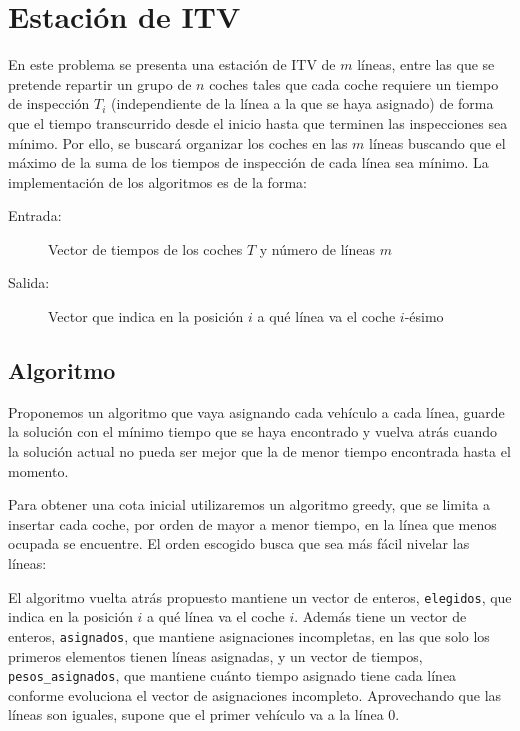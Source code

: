 \section{Estación de ITV}

En este problema se presenta una estación de ITV de $m$ líneas, entre las que
se pretende repartir un grupo de $n$ coches tales que cada coche requiere un
tiempo de inspección $T_i$ (independiente de la línea a la que se haya asignado)
de forma que el tiempo transcurrido desde el inicio hasta que terminen las
inspecciones sea mínimo. Por ello, se buscará organizar los coches en las $m$
líneas buscando que el máximo de la suma de los tiempos de inspección de cada
línea sea mínimo. La implementación de los algoritmos es de la forma:
\begin{description}
	\item[Entrada:] Vector de tiempos de los coches $T$ y número de líneas $m$
	\item[Salida:] Vector que indica en la posición $i$ a qué línea va el coche $i$-ésimo
\end{description}

\subsection{Algoritmo}

Proponemos un algoritmo que vaya asignando cada vehículo a cada línea, guarde la solución con el mínimo tiempo que se haya encontrado y vuelva atrás cuando la solución actual no pueda ser mejor que la de menor tiempo encontrada hasta el momento.

Para obtener una cota inicial utilizaremos un algoritmo greedy, que se limita a insertar cada coche, por orden de mayor a menor tiempo, en la línea que menos ocupada se encuentre. El orden escogido busca que sea más fácil nivelar las líneas:



El algoritmo vuelta atrás propuesto mantiene un vector de enteros, \texttt{elegidos}, que indica en la posición $i$ a qué línea va el coche $i$. Además tiene un vector de enteros, \texttt{asignados}, que mantiene asignaciones incompletas, en las que solo los primeros elementos tienen líneas asignadas, y un vector de tiempos, \texttt{pesos\_asignados}, que mantiene cuánto tiempo asignado tiene cada línea conforme evoluciona el vector de asignaciones incompleto. Aprovechando que las líneas son iguales, supone que el primer vehículo va a la línea 0.

